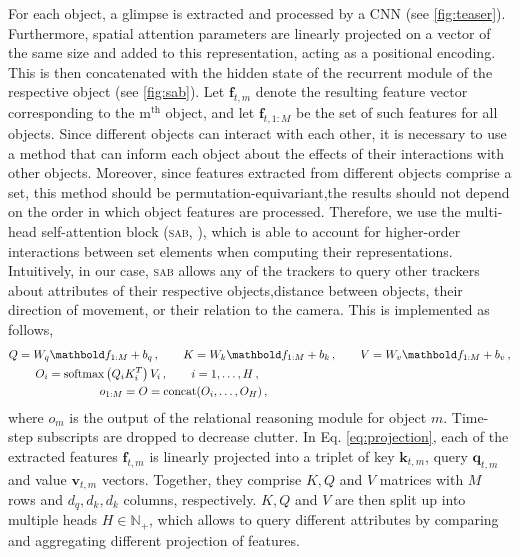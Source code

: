 For each object, a glimpse is extracted and processed by a CNN (see \cref{fig:teaser}). Furthermore, spatial attention parameters are linearly projected on a vector of the same size and added to this representation, acting as a positional encoding. This is then concatenated with the hidden state of the recurrent module of the respective object (see \cref{fig:sab}). Let $\mathbf{f}_{t, m}$ denote the resulting feature vector corresponding to the m$^\mathrm{th}$ object, and let $\mathbf{f}_{t, 1:M}$ be the set of such features for all objects.
Since different objects can interact with each other, it is necessary to use a method that can inform each object about the effects of their interactions with other objects.
Moreover, since features extracted from different objects comprise a set, this method should be permutation-equivariant,\ie the results should not depend on the order in which object features are processed.
Therefore, we use the multi-head self-attention block (\textsc{sab}, \citet{Lee2019set}), which is able to account for higher-order interactions between set elements when computing their representations. %
Intuitively, in our case, \textsc{sab} allows any of the trackers to query other trackers about attributes of their respective objects,\eg distance between objects, their direction of movement, or their relation to the camera.
This is implemented as follows,
\begin{align}
Q &= W_q \mathbf{f}_{1:M} + b_q\,, \qquad K = W_k \mathbf{f}_{1:M} + b_k\,, \qquad V = W_v \mathbf{f}_{1:M} + b_v \label{eq:projection}\,,\\
&\hspace{1.5em} O_i = \operatorname{softmax}\left( Q_i K_i^T \right) V_i\,, \qquad i=1,\dots,H\,, \label{eq:att}\\
&\hspace{7em} o_{1:M} = O = \operatorname{concat}(O_i,\dots,O_H)\,, \label{eq:multihead}
\end{align}
where $o_m$ is the output of the relational reasoning module for object $m$. Time-step subscripts are dropped to decrease clutter.
In Eq. \ref{eq:projection}, each of the extracted features $\mathbf{f}_{t,m}$ is linearly projected into a triplet of key $\mathbf{k}_{t,m}$, query $\mathbf{q}_{t,m}$ and value $\mathbf{v}_{t,m}$ vectors. Together, they comprise $K, Q$ and $V$ matrices with $M$ rows and $d_q, d_k, d_k$ columns, respectively.
$K, Q$ and $V$ are then split up into multiple heads $H \in \mathbb{N}_+$, which allows to query different attributes by comparing and aggregating different projection of features.
